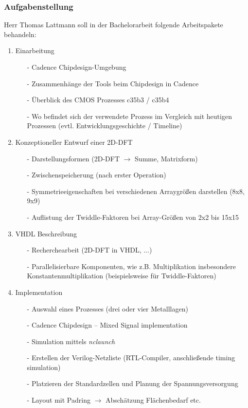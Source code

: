 \subsubsection*{Aufgabenstellung}
Herr Thomas Lattmann soll in der Bachelorarbeit folgende Arbeitspakete behandeln: 
%
\begin{enumerate}
	\item Einarbeitung
	\begin{itemize}
		\item[-] Cadence Chipdesign-Umgebung
		\item[-] Zusammenhänge der Tools beim Chipdesign in Cadence
		\item[-] Überblick des CMOS Prozesses c35b3 / c35b4
		\item[-] Wo befindet sich der verwendete Prozess im Vergleich mit heutigen Prozessen (evtl. Entwicklungsgeschichte / Timeline)
	\end{itemize}
	
	\item Konzeptioneller Entwurf einer 2D-DFT
	\begin{itemize}
		\item[-] Darstellungsformen (2D-DFT $\rightarrow$ Summe, Matrixform)
		\item[-] Zwischenspeicherung (nach erster Operation)
		\item[-] Symmetrieeigenschaften bei verschiedenen Arraygrößen darstellen (8x8, 9x9) 
		\item[-] Auflistung der Twiddle-Faktoren bei Array-Größen von 2x2 bis 15x15		
	\end{itemize}
	
	\item VHDL Beschreibung
	\begin{itemize}
		\item[-] Recherchearbeit (2D-DFT in VHDL, ...) 
		\item[-] Parallelisierbare Komponenten, wie z.B. Multiplikation insbesondere Konstantenmultiplikation (beispielsweise für Twiddle-Faktoren)
	\end{itemize}
	
	\item Implementation
	\begin{itemize}
		\item[-] Auswahl eines Prozesses (drei oder vier Metalllagen)
		\item[-] Cadence Chipdesign -- Mixed Signal implementation 
		\item[-] Simulation mittels \textit{nclaunch}
		\item[-] Erstellen der Verilog-Netzliste (RTL-Compiler, anschließende timing simulation)
		\item[-] Platzieren der Standardzellen und Planung der Spannungsversorgung
		\item[-] Layout mit Padring $\rightarrow$ Abschätzung Flächenbedarf etc.
	\end{itemize}


\end{enumerate}
